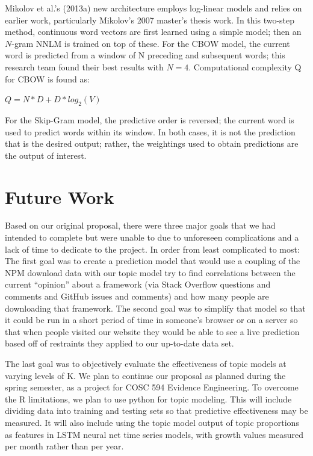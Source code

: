 \documentclass[conference]{IEEEtran}
\begin{document}
Mikolov et al.'s (2013a) new architecture employs log-linear models and relies on earlier work, particularly Mikolov's 2007 master's thesis work. In this two-step method, continuous word vectors are first learned using a simple model; then an $N$-gram NNLM is trained on top of these. For the CBOW model, the current word is predicted from a window of N preceding and subsequent words; this research team found their best results with $N=4$. Computational complexity Q for CBOW is found as:
\begin{center}
$Q = N * D + D * log_2(V)$
\end{center}
For the Skip-Gram model, the predictive order is reversed; the current word is used to predict words within its window. In both cases, it is not the prediction that is the desired output; rather, the weightings used to obtain predictions are the output of interest.

\section{Future Work}

Based on our original proposal, there were three major goals that we had intended to complete but were unable to due to unforeseen complications and a lack of time to dedicate to the project. In order from least complicated to most: The first goal was to create a prediction model that would use a coupling of the NPM download data with our topic model try to find correlations between the current “opinion” about a framework (via Stack Overflow questions and comments and GitHub issues and comments) and how many people are downloading that framework. The second goal was to simplify that model so that it could be run in a short period of time in someone's browser or on a server so that when people visited our website they would be able to see a live prediction based off of restraints they applied to our up-to-date data set. 

The last goal was to objectively evaluate the effectiveness of topic models at varying levels of K. We plan to continue our proposal as planned during the spring semester, as a project for COSC 594 Evidence Engineering. To overcome the R limitations, we plan to use python for topic modeling. This will include dividing data into training and testing sets so that predictive effectiveness may be measured. It will also include using the topic model output of topic proportions as features in LSTM neural net time series models, with growth values measured per month rather than per year.
\end{document}
